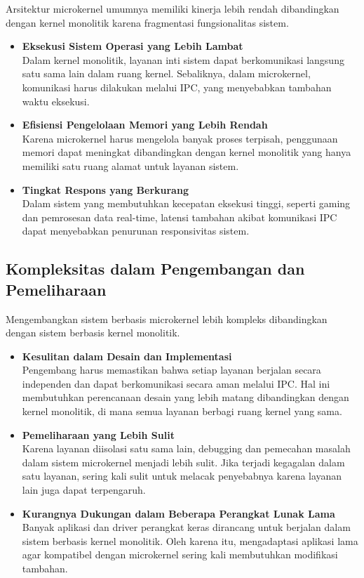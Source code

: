 Arsitektur microkernel umumnya memiliki kinerja lebih rendah dibandingkan dengan kernel monolitik karena fragmentasi fungsionalitas sistem.

\begin{itemize}
	\item \textbf{Eksekusi Sistem Operasi yang Lebih Lambat} \\
	Dalam kernel monolitik, layanan inti sistem dapat berkomunikasi langsung satu sama lain dalam ruang kernel. Sebaliknya, dalam microkernel, komunikasi harus dilakukan melalui IPC, yang menyebabkan tambahan waktu eksekusi.
	
	\item \textbf{Efisiensi Pengelolaan Memori yang Lebih Rendah} \\
	Karena microkernel harus mengelola banyak proses terpisah, penggunaan memori dapat meningkat dibandingkan dengan kernel monolitik yang hanya memiliki satu ruang alamat untuk layanan sistem.
	
	\item \textbf{Tingkat Respons yang Berkurang} \\
	Dalam sistem yang membutuhkan kecepatan eksekusi tinggi, seperti gaming dan pemrosesan data real-time, latensi tambahan akibat komunikasi IPC dapat menyebabkan penurunan responsivitas sistem.
\end{itemize}

\subsection{Kompleksitas dalam Pengembangan dan Pemeliharaan}

Mengembangkan sistem berbasis microkernel lebih kompleks dibandingkan dengan sistem berbasis kernel monolitik.

\begin{itemize}
	\item \textbf{Kesulitan dalam Desain dan Implementasi} \\
	Pengembang harus memastikan bahwa setiap layanan berjalan secara independen dan dapat berkomunikasi secara aman melalui IPC. Hal ini membutuhkan perencanaan desain yang lebih matang dibandingkan dengan kernel monolitik, di mana semua layanan berbagi ruang kernel yang sama.
	
	\item \textbf{Pemeliharaan yang Lebih Sulit} \\
	Karena layanan diisolasi satu sama lain, debugging dan pemecahan masalah dalam sistem microkernel menjadi lebih sulit. Jika terjadi kegagalan dalam satu layanan, sering kali sulit untuk melacak penyebabnya karena layanan lain juga dapat terpengaruh.
	
	\item \textbf{Kurangnya Dukungan dalam Beberapa Perangkat Lunak Lama} \\
	Banyak aplikasi dan driver perangkat keras dirancang untuk berjalan dalam sistem berbasis kernel monolitik. Oleh karena itu, mengadaptasi aplikasi lama agar kompatibel dengan microkernel sering kali membutuhkan modifikasi tambahan.
\end{itemize}

